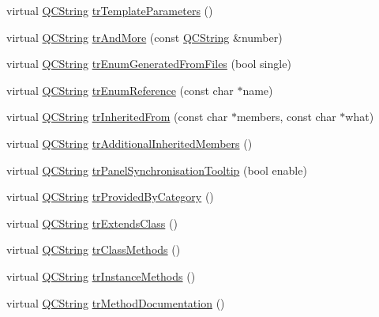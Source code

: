 \begin{DoxyCompactItemize}
\item 
virtual \mbox{\hyperlink{class_q_c_string}{Q\+C\+String}} \mbox{\hyperlink{class_translator_brazilian_a196d7b129a7ce773bb2ea409c2823f54}{tr\+Template\+Parameters}} ()
\item 
virtual \mbox{\hyperlink{class_q_c_string}{Q\+C\+String}} \mbox{\hyperlink{class_translator_brazilian_a36d4243c3840fde560ab5ea4b7231568}{tr\+And\+More}} (const \mbox{\hyperlink{class_q_c_string}{Q\+C\+String}} \&number)
\item 
virtual \mbox{\hyperlink{class_q_c_string}{Q\+C\+String}} \mbox{\hyperlink{class_translator_brazilian_af7ae82caa6c7afffaed7aed1d051c3db}{tr\+Enum\+Generated\+From\+Files}} (bool single)
\item 
virtual \mbox{\hyperlink{class_q_c_string}{Q\+C\+String}} \mbox{\hyperlink{class_translator_brazilian_af0692614b98ea9e91622140461e4bbec}{tr\+Enum\+Reference}} (const char $\ast$name)
\item 
virtual \mbox{\hyperlink{class_q_c_string}{Q\+C\+String}} \mbox{\hyperlink{class_translator_brazilian_a8508dc9763d85488ccbf7968af656c04}{tr\+Inherited\+From}} (const char $\ast$members, const char $\ast$what)
\item 
virtual \mbox{\hyperlink{class_q_c_string}{Q\+C\+String}} \mbox{\hyperlink{class_translator_brazilian_a6a7579d722b785447709b80a279ff563}{tr\+Additional\+Inherited\+Members}} ()
\item 
virtual \mbox{\hyperlink{class_q_c_string}{Q\+C\+String}} \mbox{\hyperlink{class_translator_brazilian_aebe00e16cdea8ea6c3b4636b2c6628c5}{tr\+Panel\+Synchronisation\+Tooltip}} (bool enable)
\item 
virtual \mbox{\hyperlink{class_q_c_string}{Q\+C\+String}} \mbox{\hyperlink{class_translator_brazilian_aa35cf5921996a47d4a623c42fb9b5bc8}{tr\+Provided\+By\+Category}} ()
\item 
virtual \mbox{\hyperlink{class_q_c_string}{Q\+C\+String}} \mbox{\hyperlink{class_translator_brazilian_a87384ac8f144a958037bbca3dad34ef8}{tr\+Extends\+Class}} ()
\item 
virtual \mbox{\hyperlink{class_q_c_string}{Q\+C\+String}} \mbox{\hyperlink{class_translator_brazilian_a4b6f43de2a7df631605e4739146b6086}{tr\+Class\+Methods}} ()
\item 
virtual \mbox{\hyperlink{class_q_c_string}{Q\+C\+String}} \mbox{\hyperlink{class_translator_brazilian_abacecea922d60b117f2b63999287ad8a}{tr\+Instance\+Methods}} ()
\item 
virtual \mbox{\hyperlink{class_q_c_string}{Q\+C\+String}} \mbox{\hyperlink{class_translator_brazilian_a30a9731a9f5f8bf9cddeca4db003cfe2}{tr\+Method\+Documentation}} ()

\end{DoxyCompactItemize}
